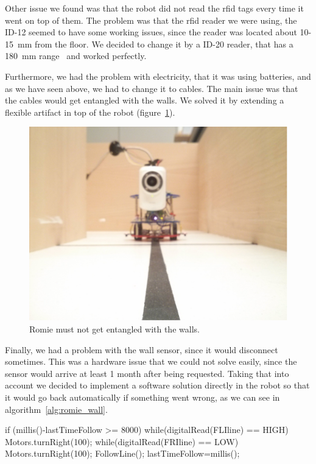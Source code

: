 Other issue we found was that the robot did not read the \acrshort{rfid} tags every time it went on
top of them. The problem was that the \acrshort{rfid} reader we were using, the ID-12 seemed to have
some working issues, since the reader was located about 10-15~mm from the floor. We decided to
change it by a ID-20 reader, that has a 180~mm range~\cite{rfid} and worked perfectly.

Furthermore, we had the problem with electricity, that it was using batteries, and as we have seen
above, we had to change it to cables. The main issue was that the cables would get entangled with
the walls. We solved it by extending a flexible artifact in top of the robot
(figure~\ref{fig:lines}).

\begin{figure}[!htbp]
	\centering
	\includegraphics[height=0.35\textheight]{fig/lines}
	\caption{Romie must not get entangled with the walls.}
	\label{fig:lines}
\end{figure}

Finally, we had a problem with the wall sensor, since it would disconnect sometimes. This was a
hardware issue that we could not solve easily, since the sensor would arrive at least 1 month after
being requested. Taking that into account we decided to implement a software solution directly in
the robot so that it would go back automatically if something went wrong, as we can see in
algorithm~\ref{alg:romie_wall}.

\begin{center}
\begin{minipage}{.9\textwidth}
\singlespace
\begin{pyglist}[language=c, caption={Arduino code for returning if wall was hit.},
	label={alg:romie_wall}, listingname={Algorithm}, numbers=left]
if (millis()-lastTimeFollow >= 8000) {
	while(digitalRead(FLIline) == HIGH) Motors.turnRight(100);
	while(digitalRead(FRIline) == LOW) Motors.turnRight(100);
	FollowLine();
	lastTimeFollow=millis();
}
\end{pyglist}
\end{minipage}
\end{center}
